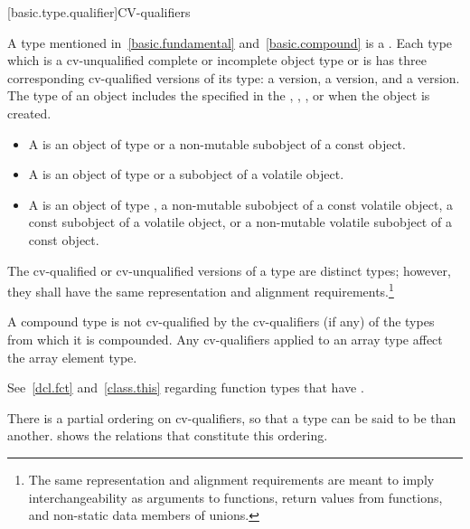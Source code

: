 [basic.type.qualifier]{CV-qualifiers}

\pnum
{}%
%
%
A type mentioned in~\ref{basic.fundamental} and~\ref{basic.compound} is
a . Each type which is a
cv-unqualified complete or incomplete object type or is
 has three corresponding cv-qualified
versions of its type: a  version, a
 version, and a
 version. The
type of an object includes the 
specified in the ,
,
, or
 when the object is created.
\begin{itemize}
\item A  is an object of type  or a
  non-mutable subobject of a const object.

\item A  is an object of type
   or a subobject of a volatile object.

\item A  is an object of type
  , a non-mutable subobject of a const volatile object,
  a const subobject of a volatile object, or a non-mutable volatile
  subobject of a const object.
\end{itemize}
The cv-qualified or
cv-unqualified versions of a type
are distinct types; however, they shall have the same representation and
alignment requirements.\footnote{The same representation
and alignment requirements are meant to imply
interchangeability as arguments to functions, return values from
functions, and non-static data members of unions.}

\pnum
{}%
A compound type is not cv-qualified by the
cv-qualifiers (if any) of the types from which it is compounded. Any
cv-qualifiers applied to an array type
affect the array element type.

\pnum
See~\ref{dcl.fct} and~\ref{class.this} regarding function
types that have .

\pnum
There is a partial ordering on cv-qualifiers, so that a type can be
said to be  than another.
 shows the relations that
constitute this ordering.

